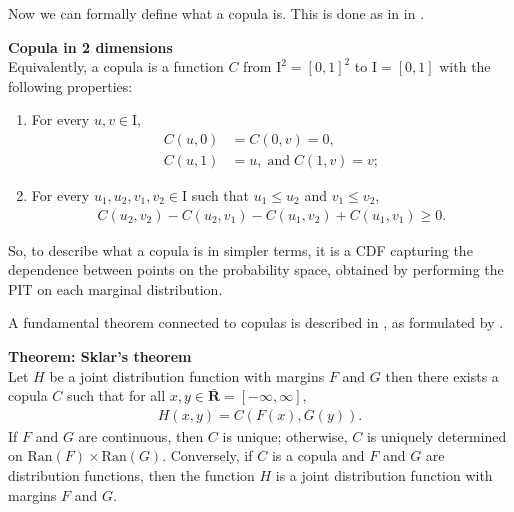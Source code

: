 Now we can formally define what a copula is. This is done as in \citet[p.~10]{Nelsen2006} in .
\begin{definition}\label{def:copula}
            \textbf{Copula in 2 dimensions}\\
            Equivalently, a copula is a function $C$ from $\mathrm{I}^2=[0,1]^2$ to $\mathrm{I} = [0,1]$ with the following properties:
            \begin{enumerate}
                \item For every $u, v \in \mathrm{I}$,
                \begin{align*}
                    C(u,0) &= C(0,v) = 0,\\
                    C(u,1) &= u, \; \mathrm{and } \; C(1,v) = v;
                \end{align*}
                \item For every $u_1, u_2, v_1, v_2 \in \mathrm{I}$ such that $u_1 \leq u_2$ and $v_1 \leq v_2$,
                \begin{align*}
                    C(u_2,v_2) - C(u_2,v_1) - C(u_1,v_2) + C(u_1,v_1) \geq 0.
                \end{align*}
            \end{enumerate}
\end{definition}

So, to describe what a copula is in simpler terms, it is a \gls{CDF} capturing the dependence between points on the probability space, obtained by performing the \gls{PIT} on each marginal distribution. 

A fundamental theorem connected to copulas is described in , as formulated by \citet[p.~18]{Nelsen2006}. 
\begin{theorem}\label{the:Sklars}
        \textbf{Theorem: Sklar's theorem} \\
        Let $H$ be a joint distribution function with margins $F$ and $G$ then there exists a copula $C$ such that for all $x,y \in \bar{\mathbf{R}} = \left[-\infty, \infty \right]$, 
        \begin{align}
            H(x,y) = C(F(x), G(y)). \label{eq:Sklar}
        \end{align}
        If $F$ and $G$ are continuous, then $C$ is unique; otherwise, $C$ is uniquely determined on $\mathrm{Ran}(F)\times\mathrm{Ran}(G)$. Conversely, if $C$ is a copula and $F$ and $G$ are distribution functions, then the function $H$ is a joint distribution function with margins $F$ and $G$.
\end{theorem}

